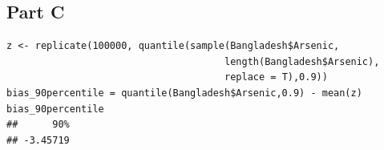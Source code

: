 \documentclass{article}\usepackage[]{graphicx}\usepackage[]{color}
\makeatletter
\newenvironment{kframe}{%
 \def\at@end@of@kframe{}%
 \ifinner\ifhmode%
  \def\at@end@of@kframe{\end{minipage}}%
  \begin{minipage}{\columnwidth}%
 \fi\fi%
 \def\FrameCommand##1{\hskip\@totalleftmargin \hskip-\fboxsep
 \colorbox{shadecolor}{##1}\hskip-\fboxsep
     \hskip-\linewidth \hskip-\@totalleftmargin \hskip\columnwidth}%
 \MakeFramed {\advance\hsize-\width
   \@totalleftmargin\z@ \linewidth\hsize
   \@setminipage}}%
 {\par\unskip\endMakeFramed%
 \at@end@of@kframe}
\newenvironment{knitrout}{}{} %
\makeatother
\begin{document}
\subsection*{Part C}
\begin{knitrout}
\color{fgcolor}\begin{kframe}
\begin{verbatim}
z <- replicate(100000, quantile(sample(Bangladesh$Arsenic,
                                      length(Bangladesh$Arsenic), 
                                      replace = T),0.9))
bias_90percentile = quantile(Bangladesh$Arsenic,0.9) - mean(z)
bias_90percentile
##      90% 
## -3.45719
\end{verbatim}
\end{kframe}
\end{knitrout}
\end{document}
